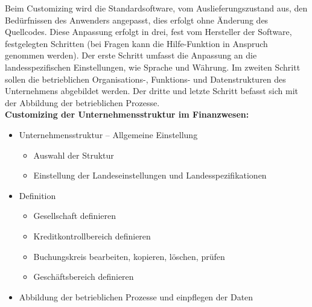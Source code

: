 \label{sec:Aufgabe 2}
 
Beim Customizing wird die Standardsoftware, vom Auslieferungszustand aus, den
Bedürfnissen des Anwenders angepasst, dies erfolgt ohne Änderung des Quellcodes.
Diese Anpassung erfolgt in drei, fest vom Hersteller der Software, festgelegten
Schritten (bei Fragen kann die Hilfe-Funktion in Anspruch genommen werden). Der
erste Schritt umfasst die Anpassung an die landesspezifischen Einstellungen, wie
Sprache und Währung. Im zweiten Schritt sollen die betrieblichen Organisations-,
Funktions- und Datenstrukturen des Unternehmens abgebildet werden. Der dritte und letzte Schritt befasst sich mit der Abbildung der betrieblichen Prozesse.\\[4ex]
\textbf{Customizing der Unternehmensstruktur im Finanzwesen:}
\begin{itemize}
	\item Unternehmensstruktur – Allgemeine Einstellung
	\begin{itemize}
	  \item Auswahl der Struktur
	  \item Einstellung der Landeseinstellungen und Landesspezifikationen
	\end{itemize}
	\item Definition
	
	\begin{itemize}
	  \item Gesellschaft definieren
	  \item Kreditkontrollbereich definieren
	  \item Buchungskreis bearbeiten, kopieren, löschen, prüfen
	  \item Geschäftsbereich definieren
	\end{itemize}
	\item Abbildung der betrieblichen Prozesse und einpflegen der Daten
\end{itemize}
